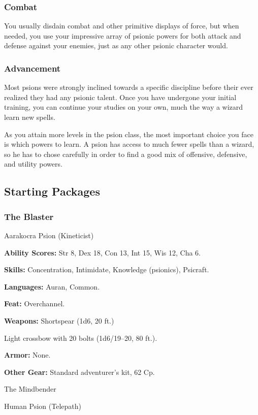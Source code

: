 \subsubsection{Combat}

You usually disdain combat and other primitive displays of force, but when needed, you use your impressive array of psionic powers for both attack and defense against your enemies, just as any other psionic character would.

\subsubsection{Advancement}

Most psions were strongly inclined towards a specific discipline before their ever realized they had any psionic talent. Once you have undergone your initial training, you can continue your studies on your own, much the way a wizard learn new spells.

As you attain more levels in the psion class, the most important choice you face is which powers to learn. A psion has access to much fewer spells than a wizard, so he has to chose carefully in order to find a good mix of offensive, defensive, and utility powers.

\subsection{Starting Packages}
\subsubsection{The Blaster}

Aarakocra Psion (Kineticist)

\textbf{Ability Scores:} Str 8, Dex 18, Con 13, Int 15, Wis 12, Cha 6.

\textbf{Skills:} Concentration, Intimidate, Knowledge (psionics), Psicraft.

\textbf{Languages:} Auran, Common.

\textbf{Feat:} Overchannel.

\textbf{Weapons:} Shortspear (1d6, 20 ft.)

Light crossbow with 20 bolts (1d6/19–20, 80 ft.).

\textbf{Armor:} None.

\textbf{Other Gear:} Standard adventurer's kit, 62 Cp.

The Mindbender

Human Psion (Telepath)

